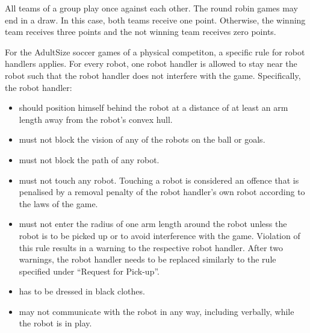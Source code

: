   

  
  \bigskip


\bigskip

All teams of a group play once against each other.
The round robin games may end in a draw.
In this case, both teams receive one point.
Otherwise, the winning team receives three points and the not winning team
receives zero points.

\bigskip

For the AdultSize soccer games of a physical competiton, a specific rule for robot handlers applies. For every robot, one robot handler is allowed to stay near the robot such that the robot handler does not interfere with the game. Specifically, the robot handler:
\begin{itemize}
\item should position himself behind the robot at a distance of at least an arm length away from the robot's convex hull.
\item must not block the vision of any of the robots on the ball or goals.
\item must not block the path of any robot.
\item must not touch any robot. Touching a robot is considered an offence that is penalised by a removal penalty of the robot handler's own robot according to the laws of the game.
\item must not enter the radius of one arm length around the robot unless the robot is to be picked up or to avoid interference with the game. Violation of this rule results in a warning to the respective robot handler. After two warnings, the robot handler needs to be replaced similarly to the rule specified under ``Request for Pick-up''.
\item has to be dressed in black clothes.
\item may not communicate with the robot in any way, including verbally, while the robot is in play.
\end{itemize}
\color{black}


